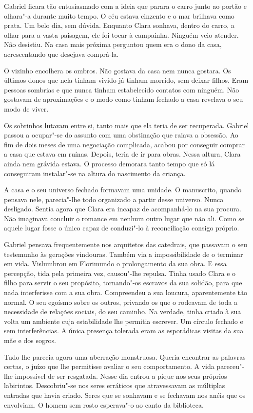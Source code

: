 Gabriel ficara tão entusiasmado com a ideia que parara o carro junto ao
portão e olhara"-a durante muito tempo. O céu estava cinzento e o mar
brilhava como prata. Um belo dia, sem dúvida. Enquanto Clara sonhava,
dentro do carro, a olhar para a vasta paisagem, ele foi tocar à
campainha. Ninguém veio atender. Não desistiu. Na casa mais próxima
perguntou quem era o dono da casa, acrescentando que desejava comprá-la.

O vizinho encolhera os ombros. Não gostava da casa nem nunca gostara. Os
últimos donos que nela tinham vivido já tinham morrido, sem deixar
filhos. Eram pessoas sombrias e que nunca tinham estabelecido contatos
com ninguém. Não gostavam de aproximações e o modo como tinham fechado a
casa revelava o seu modo de viver.

Os sobrinhos lutavam entre si, tanto mais que ela teria de ser
recuperada. Gabriel passou a ocupar"-se do assunto com uma obstinação que
raiava a obsessão. Ao fim de dois meses de uma negociação complicada,
acabou por conseguir comprar a casa que estava em ruínas. Depois, teria
de ir para obras. Nessa altura, Clara ainda nem grávida estava. O
processo demorara tanto tempo que só lá conseguiram instalar"-se na
altura do nascimento da criança.

A casa e o seu universo fechado formavam uma unidade. O manuscrito,
quando pensava nele, parecia"-lhe todo organizado a partir desse
universo. Nunca desligado. Sentia agora que Clara era incapaz de
acompanhá-lo na sua procura. Não imaginava concluir o romance em nenhum
outro lugar que não ali. Como se aquele lugar fosse o único capaz de
conduzi"-lo à reconciliação consigo próprio.

Gabriel pensava frequentemente nos arquitetos das catedrais, que
passavam o seu testemunho às gerações vindouras. Também via a
impossibilidade de o terminar em vida. Vislumbrou em Florimundo o
prolongamento da sua obra. E essa percepção, tida pela primeira vez,
causou"-lhe repulsa. Tinha usado Clara e o filho para servir o seu
propósito, tornando"-os escravos da sua solidão, para que nada
interferisse com a sua obra. Compreendeu a sua loucura, aparentemente
tão normal. O seu egoísmo sobre os outros, privando os que o rodeavam de
toda a necessidade de relações sociais, do seu caminho. Na verdade,
tinha criado à sua volta um ambiente cuja estabilidade lhe permitia
escrever. Um círculo fechado e sem interferências. A única presença
tolerada eram as esporádicas visitas da sua mãe e dos sogros.

Tudo lhe parecia agora uma aberração monstruosa. Queria encontrar as
palavras certas, o juízo que lhe permitisse avaliar o seu comportamento.
A vida pareceu"-lhe impossível de ser resgatada. Nesse dia entrou a pique
nos seus próprios labirintos. Descobriu"-se nos seres erráticos que
atravessavam as múltiplas entradas que havia criado. Seres que se
sonhavam e se fechavam nos anéis que os envolviam. O homem sem rosto
esperava"-o ao canto da biblioteca.

